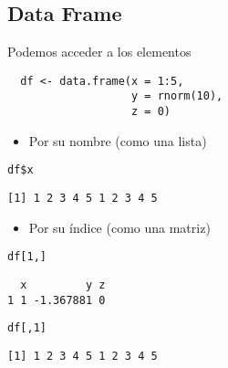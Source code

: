 \documentclass[xcolor={usenames,svgnames,dvipsnames}]{beamer}
\begin{document}
\subsection{Data Frame}
\label{sec:org13342c0}
\begin{frame}[fragile,label={sec:orgbd0710f}]{Podemos acceder a los elementos}
 \lstset{language=r,label= ,caption= ,captionpos=b,numbers=none}
\begin{lstlisting}
  df <- data.frame(x = 1:5,
                   y = rnorm(10),
                   z = 0)
\end{lstlisting}

\begin{itemize}
\item Por su nombre (como una lista)
\end{itemize}
\lstset{language=r,label= ,caption= ,captionpos=b,numbers=none}
\begin{lstlisting}
df$x
\end{lstlisting}

\begin{verbatim}
[1] 1 2 3 4 5 1 2 3 4 5
\end{verbatim}

\begin{itemize}
\item Por su índice (como una matriz)
\end{itemize}
\lstset{language=r,label= ,caption= ,captionpos=b,numbers=none}
\begin{lstlisting}
df[1,]
\end{lstlisting}

\begin{verbatim}
  x         y z
1 1 -1.367881 0
\end{verbatim}

\lstset{language=r,label= ,caption= ,captionpos=b,numbers=none}
\begin{lstlisting}
df[,1]
\end{lstlisting}

\begin{verbatim}
[1] 1 2 3 4 5 1 2 3 4 5
\end{verbatim}
\end{frame}
\end{document}
